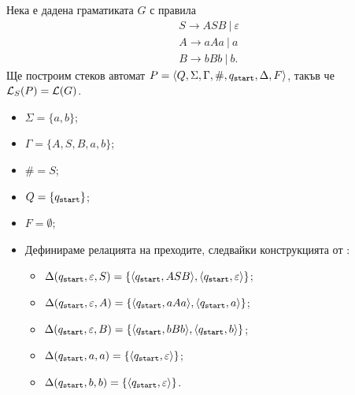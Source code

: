 \begin{example}
  Нека е дадена граматиката $G$ с правила 
  \begin{align*}
    & S \to ASB\ |\ \varepsilon\\
    & A \to aAa\ |\ a\\
    & B \to bBb\ |\ b.
  \end{align*}
  Ще построим стеков автомат $P = \langle{Q,\Sigma,\Gamma,\#,q_{\texttt{start}},\Delta,F}\rangle$, такъв че $\mathcal{L}_S(P) = \mathcal{L}(G)$.
  \begin{itemize}
  \item
    $\Sigma = \{a,b\}$;
  \item 
    $\Gamma = \{A,S,B,a,b\}$;
  \item
    $\# = S$;
  \item
    $Q = \{q_{\texttt{start}}\}$;
  \item
    $F = \emptyset$;
  \item
    Дефинираме релацията на преходите, следвайки конструкцията от :
    \begin{itemize}
    \item 
      $\Delta(q_{\texttt{start}},\varepsilon, S) = \{\langle{q_{\texttt{start}},ASB}\rangle, \langle{q_{\texttt{start}},\varepsilon}\rangle\}$;
    \item
      $\Delta(q_{\texttt{start}}, \varepsilon, A) = \{\langle{q_{\texttt{start}}, aAa}\rangle, \langle{q_{\texttt{start}}, a}\rangle\}$;
    \item
      $\Delta(q_{\texttt{start}}, \varepsilon, B) = \{\langle{q_{\texttt{start}}, bBb}\rangle, \langle{q_{\texttt{start}}, b}\rangle\}$;
    \item
      $\Delta(q_{\texttt{start}}, a, a) = \{\langle{q_{\texttt{start}},\varepsilon}\rangle\}$;
    \item
      $\Delta(q_{\texttt{start}}, b, b) = \{\langle{q_{\texttt{start}},\varepsilon}\rangle\}$.
    \end{itemize}
  \end{itemize}
\end{example}


